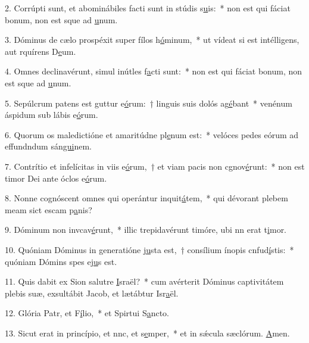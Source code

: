 2. Corrúpti sunt, et abominábiles facti sunt in stúdis s\uline{u}is:~* non est qui fáciat bonum, non est sque ad \uline{u}num.\par 
3. Dóminus de cælo prospéxit super fílos h\uline{ó}minum,~* ut vídeat si est intélligens, aut rquírens D\uline{e}um.\par 
4. Omnes declinavérunt, simul inútles f\uline{a}cti sunt:~* non est qui fáciat bonum, non est sque ad \uline{u}num.\par 
5. Sepúlcrum patens est guttur e\uline{ó}rum:~† linguis suis dolós ag\uline{é}bant~* venénum áspidum sub lábis e\uline{ó}rum.\par 
6. Quorum os maledictióne et amaritúdne pl\uline{e}num est:~* velóces pedes eórum ad effundndum sán\uline{gui}nem.\par 
7. Contrítio et infelícitas in viis e\uline{ó}rum,~† et viam pacis non cgnov\uline{é}runt:~* non est timor Dei ante óclos e\uline{ó}rum.\par 
8. Nonne cognóscent omnes qui operántur inquit\uline{á}tem,~* qui dévorant plebem meam sict escam p\uline{a}nis?\par 
9. Dóminum non invcav\uline{é}runt,~* illic trepidavérunt timóre, ubi nn erat t\uline{i}mor.\par 
10. Quóniam Dóminus in generatióne \uline{ju}sta est,~† consílium ínopis cnfud\uline{í}stis:~* quóniam Dómins spes ej\uline{u}s est.\par 
11. Quis dabit ex Sion salutre \uline{I}sraël?~* cum avérterit Dóminus captivitátem plebis suæ, exsultábit Jacob, et lætábtur Isr\uline{a}ël.\par 
12. Glória Patr, et F\uline{í}lio,~* et Spirtui S\uline{a}ncto.\par 
13. Sicut erat in princípio, et nnc, et s\uline{e}mper,~* et in sǽcula sæclórum. \uline{A}men.\par 
